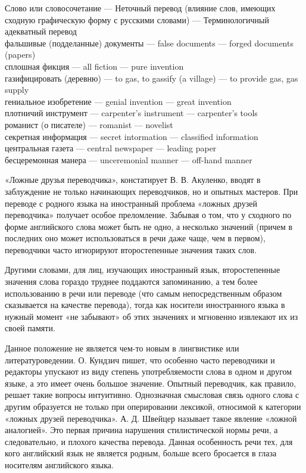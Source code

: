 Слово или словосочетание --- Неточный перевод (влияние слов, имеющих сходную графическую форму с русскими словами) --- Терминологичный адекватный перевод
\\

фальшивые (подделанные) документы --- false documents --- forged documents (papers)
\\

сплошная фикция --- all fiction --- pure invention
\\

газифицировать (деревню) --- to gas, to gassify (a village) --- to provide gas, gas supply
\\

гениальное изобретение --- genial invention --- great invention
\\

плотничий инструмент --- carpenter's instrument --- carpenter's tools
\\

романист (о писателе) --- romanist --- novelist
\\

секретная информация --- secret intormation --- classified information
\\

центральная газета --- central newspaper --- leading paper
\\

бесцеремонная манера --- unceremonial manner --- off-hand manner

«Ложные друзья переводчика», констатирует В. В. Акуленко, вводят в заблуждение не только начинающих переводчиков, но и опытных мастеров. При переводе с родного языка на иностранный проблема «ложных друзей переводчика» получает особое преломление. Забывая о том, что у сходного по форме английского слова может быть не одно, а несколько значений (причем в последних оно может использоваться в речи даже чаще, чем в первом), переводчики часто игнорируют второстепенные значения таких слов.

Другими словами, для лиц, изучающих иностранный язык, второстепенные значения слова гораздо труднее поддаются запоминанию, а тем более использованию в речи или переводе (что самым непосредственным образом сказывается на качестве перевода), тогда как носители иностранного языка в нужный момент «не забывают» об этих значениях и мгновенно извлекают их из своей памяти.

Данное положение не является чем-то новым в лингвистике или литературоведении. О. Кундзич пишет, что особенно часто переводчики и редакторы упускают из виду степень употребляемости слова в одном и другом языке, а это имеет очень большое значение. Опытный переводчик, как правило, решает такие вопросы интуитивно. Однозначная смысловая связь одного слова с другим образуется не только при оперировании лексикой, относимой к категории «ложных друзей переводчика». А. Д. Швейцер называет такое явление «ложной аналогией». Это первая причина нарушения стилистической нормы речи, а следовательно, и плохого качества перевода. Данная особенность речи тех, для кого английский язык не является родным, больше всего бросается в глаза носителям английского языка.

